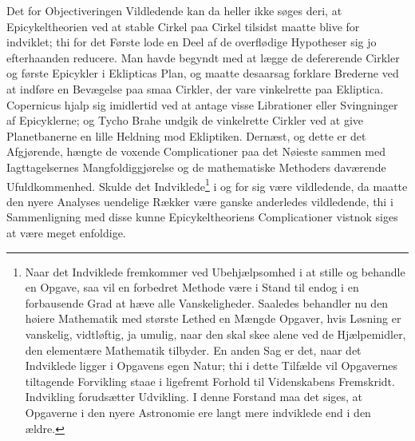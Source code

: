 \documentclass[12pt,a4paper]{book}
\begin{document}
Det for Objectiveringen Vildledende kan da heller ikke søges deri, at
Epicykeltheorien ved at stable Cirkel paa Cirkel tilsidst maatte blive
for indviklet; thi for det Første lode en Deel af de overflødige
Hypotheser sig jo efterhaanden reducere. Man havde begyndt med at lægge
de defererende Cirkler og første Epicykler i Eklipticas Plan, og maatte
desaarsag forklare Brederne ved at indføre en Bevægelse paa smaa
Cirkler, der vare vinkelrette paa Ekliptica. Copernicus hjalp sig
imidlertid ved at antage visse Librationer eller Svingninger af
Epicyklerne; og Tycho Brahe undgik de vinkelrette Cirkler ved at give
Planetbanerne en lille Heldning mod Ekliptiken. Dernæst, og dette er
det Afgjørende, hængte de voxende Complicationer paa det Nøieste sammen
med Iagttagelsernes Mangfoldiggjørelse og de mathematiske Methoders
daværende Ufuldkommenhed. Skulde det Indviklede\footnote{%
Naar det Indviklede fremkommer ved Ubehjælpsomhed i at stille og
behandle en Opgave, saa vil en forbedret Methode være i Stand til endog
i en forbausende Grad at hæve alle Vanskeligheder. Saaledes behandler nu
den høiere Mathematik med største Lethed en Mængde Opgaver, hvis Løsning
er vanskelig, vidtløftig, ja umulig, naar den skal skee alene ved de
Hjælpemidler, den elementære Mathematik tilbyder. En anden Sag er det,
naar det Indviklede ligger i Opgavens egen Natur; thi i dette Tilfælde
vil Opgavernes tiltagende Forvikling staae i ligefremt Forhold til
Videnskabens Fremskridt. Indvikling forudsætter Udvikling. I denne
Forstand maa det siges, at Opgaverne i den nyere Astronomie ere langt
mere indviklede end i den ældre.} i og for sig være vildledende, da
maatte den nyere Analyses uendelige Rækker være ganske anderledes
vildledende, thi i Sammenligning med disse kunne Epicykeltheoriens
Complicationer vistnok siges at være meget enfoldige.
\end{document}

